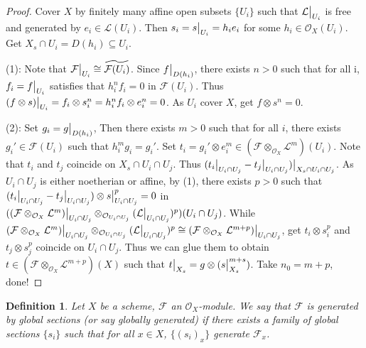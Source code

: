 \documentclass{ctexart}
\newtheorem{definition}{Definition}[section]
\begin{document}
\begin{proof}
    Cover $X$ by finitely many affine open subsets $\{U_{i}\}$ such that $\mathcal{L}\big{|}_{U_{i}}$ is free and generated by $e_{i}\in \mathcal{L}(U_{i})$.
    Then $s_{i} = s\big{|}_{U_{i}} = h_{i}e_{i}$ for some $h_{i}\in \mathcal{O}_{X}(U_{i})$.
    Get $X_{s} \cap U_{i} = D(h_{i}) \subseteq U_{i}$.  
    \par
    (1): Note that $\mathcal{F}\big{|}_{U_{i}} \cong \widetilde{\mathcal{F}(U_{i})}$.
    Since $f\big{|}_{D(h_{i})}$, there exists $n > 0$ such that for all i, $f_{i} = f\big{|}_{U_{i}}$ satisfies that $h_{i}^{n}f_{i} = 0$ in $\mathcal{F}(U_{i})$.
    Thus $(f \otimes s)\big{|}_{U_{i}} = f_{i} \otimes s_{i}^{n} = h_{i}^{n}f_{i} \otimes e_{i}^{n} = 0$.
    As $U_{i}$ cover $X$, get $f \otimes s^{n} = 0$.
    \par
    (2): Set $g_{i} = g\big{|}_{D(h_{i})}$,
    Then there exists $m > 0$ such that for all $i$, there exists $g_{i}'\in \mathcal{F}(U_{i})$ such that $h_{i}^{m}g_{i} = g_{i}'$.
    Set $t_{i} = g_{i}' \otimes e_{i}^{m}\in (\mathcal{F} \otimes_{\mathcal{O}_{X}} \mathcal{L}^{m})(U_{i})$.
    Note that $t_{i}$ and $t_{j}$ coincide on $X_{s} \cap U_{i} \cap U_{j}$.
    Thus $(t_{i}\big{|}_{U_{i} \cap U_{j}} - t_{j}\big{|}_{U_{i} \cap U_{j}})\big{|}_{X_{s} \cap U_{i} \cap U_{j}}$.
    As $U_{i} \cap U_{j}$ is either noetherian or affine, by (1), there exists $p > 0$ such that $(t_{i}\big{|}_{U_{i} \cap U_{j}} - t_{j}\big{|}_{U_{i} \cap U_{j}}) \otimes s\big{|}_{U_{i} \cap U_{j}}^{p} = 0$ in $((\mathcal{F} \otimes_{\mathcal{O}_{X}} \mathcal{L}^{m})\big{|}_{U_{i} \cap U_{j}} \otimes_{\mathcal{O}_{U_{i} \cap U_{j}}} (\mathcal{L}\big{|}_{U_{i} \cap U_{j}})^{p})(U_{i} \cap U_{j})$.
    While $(\mathcal{F} \otimes_{\mathcal{O}_{X}} \mathcal{L}^{m})\big{|}_{U_{i} \cap U_{j}} \otimes_{\mathcal{O}_{U_{i} \cap U_{j}}} (\mathcal{L}\big{|}_{U_{i} \cap U_{j}})^{p} \cong (\mathcal{F} \otimes_{\mathcal{O}_{X}} \mathcal{L}^{m + p})\big{|}_{U_{i} \cap U_{j}}$, 
    get $t_{i} \otimes s_{i}^{p}$ and $t_{j} \otimes s_{j}^{p}$ coincide on $U_{i} \cap U_{j}$.
    Thus we can glue them to obtain $t\in (\mathcal{F} \otimes_{\mathcal{O}_{X}} \mathcal{L}^{m + p})(X)$ such that $t\big{|}_{X_{s}} = g \otimes (s\big{|}_{X_{s}}^{m + s})$.
    Take $n_{0} = m + p$, done!
\end{proof}
\begin{definition}
    Let $X$ be a scheme, $\mathcal{F}$ an $\mathcal{O}_{X}$-module.
    We say that $\mathcal{F}$ is generated by global sections (or say globally generated) if there exists a family of global sections $\{s_{i}\}$ such that for all $x\in X$,
    $\{(s_{i})_{x}\}$ generate $\mathcal{F}_{x}$.
\end{definition}
\end{document}

